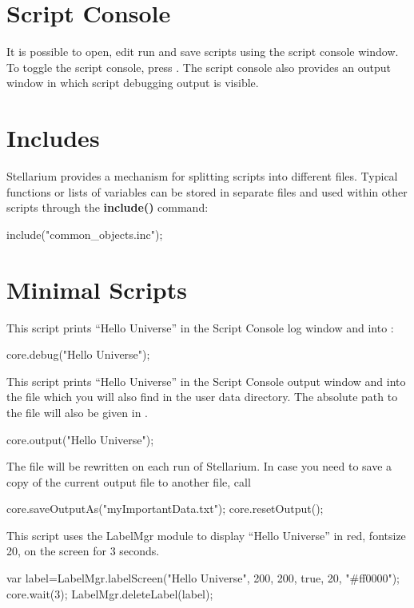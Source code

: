 \section{Script Console}
\label{sec:scripting:console}
It is possible to open, edit run and save scripts using the script
console window. To toggle the script console, press . The
script console also provides an output window in which script
debugging output is visible. 

\section{Includes}
\label{sec:scripting:includes}

Stellarium provides a mechanism for splitting scripts into different
files. Typical functions or lists of variables can be stored in
separate  files and used within other scripts through the
\textbf{include()} command:
\begin{script}
include("common_objects.inc");
\end{script}


\section{Minimal Scripts}
\label{sec:scripting:MinimalScript}
This script prints ``Hello Universe'' in the Script Console log window and into :
\begin{script}
core.debug("Hello Universe");
\end{script}

\noindent This script prints ``Hello Universe'' in the Script Console output window and into the file  
which you will also find in the user data directory. The absolute path to the file will also be given in .
\begin{script}
core.output("Hello Universe");
\end{script}
The file  will be rewritten on each run of Stellarium. In case you need to save a copy of the current output file to another file, call 
\begin{script}
core.saveOutputAs("myImportantData.txt");
core.resetOutput();
\end{script}

\noindent This script uses the LabelMgr module to display ``Hello Universe'' in red, fontsize 20, on the screen for 3 seconds.
\begin{script}
var label=LabelMgr.labelScreen("Hello Universe", 200, 200, 
                               true, 20, "#ff0000");
core.wait(3);
LabelMgr.deleteLabel(label);
\end{script}


